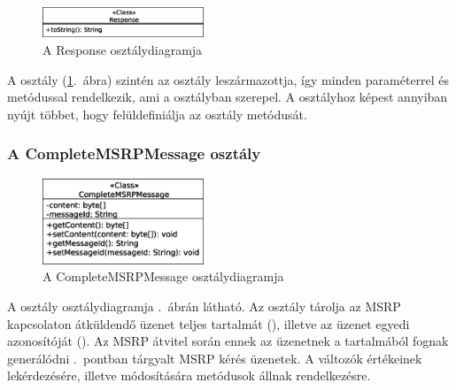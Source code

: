 \begin{figure}
  \vspace{-15pt}
  \begin{center}
    \includegraphics[width=0.43\textwidth]{img/class_diagrams/Response.eps}
  \end{center}
  \vspace{-15pt}
  \captionsetup{font=scriptsize}
  \caption{A Response osztálydiagramja}
   \label{fig:class_response}
  \vspace{-10pt}
\end{figure}
A  osztály (\ref{fig:class_response}.~ábra) szintén az  osztály leszármazottja, így minden paraméterrel és metódussal rendelkezik, ami a  osztályban szerepel. A  osztályhoz képest annyiban nyújt többet, hogy felüldefiniálja az osztály  metódusát.

\subsubsection*{A CompleteMSRPMessage osztály}
\label{sec:msrp_completmsrpemessage}

\begin{figure}
  \vspace{-15pt}
  \begin{center}
    \includegraphics[width=0.43\textwidth]{img/class_diagrams/CompleteMSRPMessage.eps}
  \end{center}
  \vspace{-15pt}
  \captionsetup{font=scriptsize}
  \caption{A CompleteMSRPMessage osztálydiagramja}
   \label{fig:class_completmsrpemessage}
  \vspace{-10pt}
\end{figure}
A  osztály osztálydiagramja .~ábrán látható. Az osztály tárolja az MSRP kapcsolaton átküldendő üzenet teljes tartalmát (), illetve az üzenet egyedi azonosítóját (). Az MSRP átvitel során ennek az üzenetnek a tartalmából fognak generálódni .~pontban tárgyalt MSRP kérés üzenetek. A változók értékeinek lekérdezésére, illetve módosítására metódusok állnak rendelkezésre.

